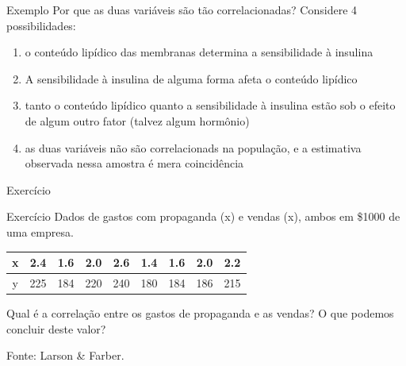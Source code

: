 \documentclass{beamer}
\begin{document}
\begin{frame}{Exemplo}
  Por que as duas variáveis são tão correlacionadas? Considere 4
  possibilidades:
  \begin{enumerate}
  \item o conteúdo lipídico das membranas \alert<1>{determina} a
    sensibilidade à insulina
  \item A sensibilidade à insulina de alguma forma afeta o conteúdo lipídico
  \item tanto o conteúdo lipídico quanto a sensibilidade à insulina
    estão sob o efeito de \alert<3>{algum outro} fator (talvez algum hormônio)
  \item as duas variáveis não são correlacionads na população, e a
    estimativa observada nessa amostra é mera coincidência
  \end{enumerate}
\end{frame}


\begin{frame}{Exercício}
  \begin{block}{Exercício}
    Dados de gastos com propaganda (x) e vendas (x), ambos em \$1000 de uma empresa.

\bigskip

\centering\begin{tabular}{|c|c|c|c|c|c|c|c|c|}
\hline
x & 2.4 &  1.6& 2.0 & 2.6 & 1.4& 1.6& 2.0& 2.2\\
\hline
y & 225& 184& 220& 240& 180& 184& 186& 215\\
\hline
    \end{tabular}

\bigskip

Qual é a correlação entre os gastos de propaganda e as vendas? O que podemos concluir deste valor?
  \end{block}

Fonte: Larson \& Farber.
\end{frame}
\end{document}
